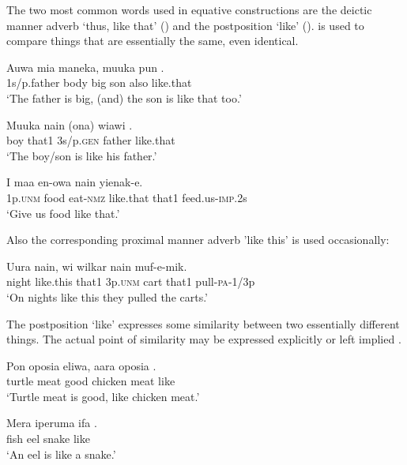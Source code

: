The two most common words used in equative constructions are the deictic manner adverb  `thus, like that' () and the postposition  `like' ().  is used to compare things that are essentially the same, even identical.

\ea%
\label{ex:x1338}
\gll Auwa  mia  maneka,  muuka  pun  . \\
1s/p.father  body  big  son  also  like.that\\
\glt `The father is big, (and) the son is like that too.'
\z

\ea%
\label{ex:x1339}
\gll Muuka  nain  (ona)  wiawi  . \\
boy  that1  3s/p.\textsc{gen}  father  like.that\\
\glt `The boy/son is like his father.'
\z

\ea%
\label{ex:x1348}
\gll I  maa  en-owa    nain  yienak-e. \\
1p.\textsc{unm}  food  eat-\textsc{nmz}  like.that  that1  feed.us-\textsc{imp}.2s\\
\glt `Give us food like that.'
\z

Also the corresponding proximal manner adverb  'like this' is used occasionally:

\ea%
\label{ex:x1347}
\gll Uura    nain,  wi  wilkar  nain  muf-e-mik. \\
night  like.this  that1  3p.\textsc{unm}  cart  that1  pull-\textsc{pa}-1/3p\\
\glt `On nights like this they pulled the carts.'
\z

The postposition  `like' expresses some similarity between two essentially different things. The actual point of similarity may be expressed explicitly  or left implied .

\ea%
\label{ex:x1341}
\gll Pon  oposia  eliwa,  aara  oposia  . \\
turtle  meat  good  chicken  meat  like\\
\glt `Turtle meat is good, like chicken meat.'
\z

\ea%
\label{ex:x1340}
\gll Mera  iperuma  ifa  . \\
fish  eel  snake  like\\
\glt `An eel is like a snake.'
\z

